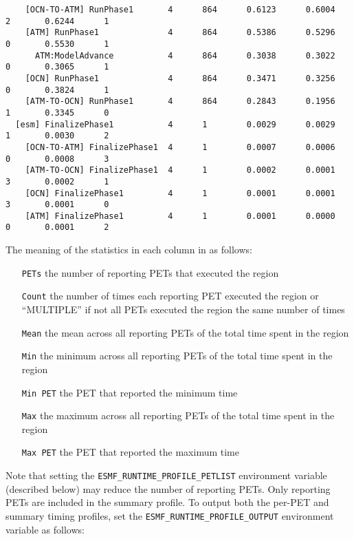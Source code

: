 \begin{verbatim}
    [OCN-TO-ATM] RunPhase1       4      864      0.6123      0.6004      2       0.6244      1      
    [ATM] RunPhase1              4      864      0.5386      0.5296      0       0.5530      1      
      ATM:ModelAdvance           4      864      0.3038      0.3022      0       0.3065      1      
    [OCN] RunPhase1              4      864      0.3471      0.3256      0       0.3824      1      
    [ATM-TO-OCN] RunPhase1       4      864      0.2843      0.1956      1       0.3345      0      
  [esm] FinalizePhase1           4      1        0.0029      0.0029      1       0.0030      2      
    [OCN-TO-ATM] FinalizePhase1  4      1        0.0007      0.0006      0       0.0008      3      
    [ATM-TO-OCN] FinalizePhase1  4      1        0.0002      0.0001      3       0.0002      1      
    [OCN] FinalizePhase1         4      1        0.0001      0.0001      3       0.0001      0      
    [ATM] FinalizePhase1         4      1        0.0001      0.0000      0       0.0001      2  
\end{verbatim}

The meaning of the statistics in each column in as follows:
\begin{itemize}
\item [{\tt PETs}] the number of reporting PETs that executed the region
\item [{\tt Count}] the number of times each reporting PET executed the region
      or ``MULTIPLE'' if not all PETs executed the region the same number of times
\item [{\tt Mean}] the mean across all reporting PETs of the total time spent in the region
\item [{\tt Min}] the minimum across all reporting PETs of the total time spent in the region
\item [{\tt Min PET}] the PET that reported the minimum time
\item [{\tt Max}] the maximum across all reporting PETs of the total time spent in the region
\item [{\tt Max PET}] the PET that reported the maximum time
\end{itemize}

Note that setting the {\tt ESMF\_RUNTIME\_PROFILE\_PETLIST} environment variable
(described below) may reduce the number of reporting PETs. Only reporting PETs are
included in the summary profile. To output both the per-PET and summary timing profiles,
set the {\tt ESMF\_RUNTIME\_PROFILE\_OUTPUT} environment variable as follows:

